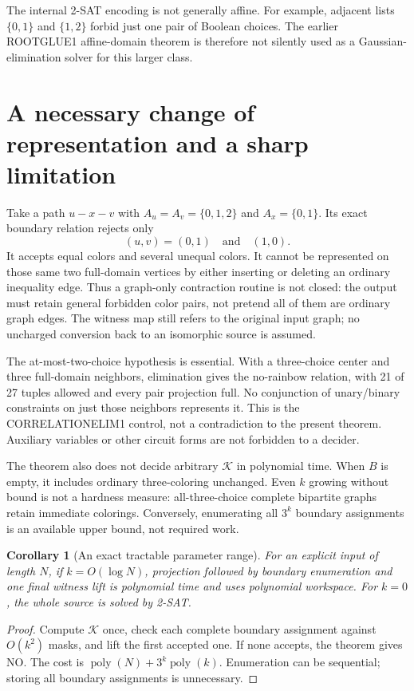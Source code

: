 \documentclass[11pt]{article}
\newtheorem{corollary}[theorem]{Corollary}
\newcommand{\COL}{\{0,1,2\}}
\begin{document}
The internal 2-SAT encoding is not generally affine. For example, adjacent
lists $\{0,1\}$ and $\{1,2\}$ forbid just one pair of Boolean choices.
The earlier ROOTGLUE1 affine-domain theorem is therefore not silently used
as a Gaussian-elimination solver for this larger class.

\section{A necessary change of representation and a sharp limitation}
Take a path $u-x-v$ with $A_u=A_v=\COL$ and $A_x=\{0,1\}$.
Its exact boundary relation rejects only
\[
                  (u,v)=(0,1)\quad\text{and}\quad(1,0).
\]
It accepts equal colors and several unequal colors. It cannot be represented
on those same two full-domain vertices by either inserting or deleting an
ordinary inequality edge. Thus a graph-only contraction routine is not closed:
the output must retain general forbidden color pairs, not pretend all of
them are ordinary graph edges. The witness map still refers to the original
input graph; no uncharged conversion back to an isomorphic source is assumed.

The at-most-two-choice hypothesis is essential. With a three-choice center
and three full-domain neighbors, elimination gives the no-rainbow relation,
with 21 of 27 tuples allowed and every pair projection full. No conjunction
of unary/binary constraints on just those neighbors represents it. This is
the CORRELATIONELIM1 control, not a contradiction to the present theorem.
Auxiliary variables or other circuit forms are not forbidden to a decider.

The theorem also does not decide arbitrary $\mathcal K$ in polynomial time.
When $B$ is empty, it includes ordinary three-coloring unchanged. Even
$k$ growing without bound is not a hardness measure: all-three-choice
complete bipartite graphs retain immediate colorings. Conversely, enumerating
all $3^k$ boundary assignments is an available upper bound, not required work.

\begin{corollary}[An exact tractable parameter range]
For an explicit input of length $N$, if $k=O(\log N)$, projection followed by
boundary enumeration and one final witness lift is polynomial time and uses
polynomial workspace. For $k=0$, the whole source is solved by 2-SAT.
\end{corollary}
\begin{proof}
Compute $\mathcal K$ once, check each complete boundary assignment against
$O(k^2)$ masks, and lift the first accepted one. If none accepts, the theorem
gives NO. The cost is $\operatorname{poly}(N)+3^k\operatorname{poly}(k)$.
Enumeration can be sequential; storing all boundary assignments is unnecessary.
\end{proof}
\end{document}
